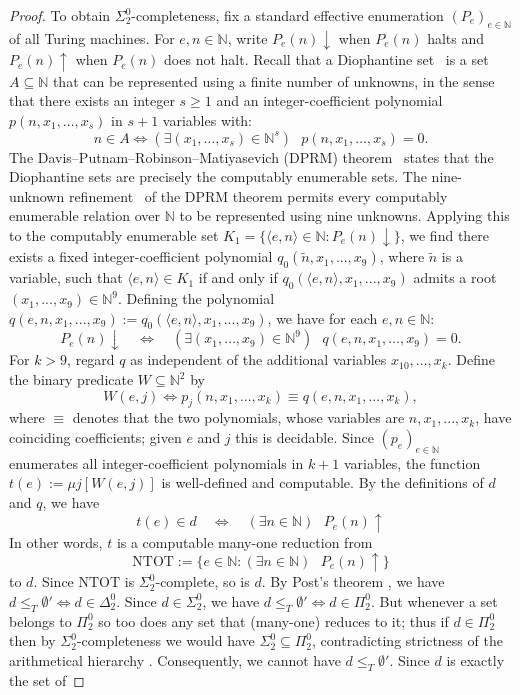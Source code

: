 \documentclass[10pt, a4paper, reqno]{amsart}
\numberwithin{equation}{section}
\renewcommand{\geq}{\geqslant}
\renewcommand{\leq}{\leqslant}
\theoremstyle{definition}
\theoremstyle{definition}
\begin{document}
\begin{proof}
To obtain $\Sigma^{0}_{2}$-completeness, fix a standard effective enumeration $(P_e)_{e\in\mathbb N}$ of all Turing machines. For $e, n \in \mathbb{N}$, write $P_e(n) \downarrow$ when $P_e(n)$ halts and $P_e(n) \uparrow$ when $P_e(n)$ does not halt. Recall that a Diophantine set~\cite{Matiyasevich1993} is a set $A \subseteq \mathbb{N}$ that can be represented using a finite number of unknowns, in the sense that there exists an integer $s \geq 1$ and an integer-coefficient polynomial $p(n, x_1, ..., x_s)$ in $s+1$ variables with:
\begin{equation*}
n \in A \iff (\exists (x_1, \ldots, x_s) \in \mathbb{N}^s) \textrm{ }p(n, x_1, \ldots, x_s) = 0.
\end{equation*}
The Davis--Putnam--Robinson--Matiyasevich (DPRM) theorem~\cite{Matiyasevich1993} states that the Diophantine sets are precisely the computably enumerable sets. The nine-unknown refinement~\cite{Jones1982} of the DPRM theorem permits every computably enumerable relation over $\mathbb N$ to be represented using nine unknowns.
Applying this to the computably enumerable set $K_1 = \{ \langle e, n \rangle \in \mathbb{N} : P_e(n) \downarrow \}$, we find there exists a fixed integer-coefficient polynomial $q_0(\tilde{n}, x_1, ..., x_9)$, where $\tilde{n}$ is a variable, such that $\langle e, n \rangle \in K_1$ if and only if $q_0(\langle e, n \rangle, x_1, ..., x_9)$ admits a root $(x_1, ..., x_9) \in \mathbb{N}^{9}$. Defining the polynomial $q(e, n, x_1, ..., x_9) := q_0(\langle e, n \rangle, x_1, ..., x_9)$, we have for each $e, n \in \mathbb{N}$:
\[
    P_e(n)\downarrow
    \quad\Longleftrightarrow\quad
    (\exists (x_1, \ldots, x_9) \in\mathbb N^9)\textrm{ } q(e,n,x_1,\ldots, x_9)=0.
\]
For $k>9$, regard $q$ as independent of the additional variables
$x_{10},\ldots,x_k$. Define the binary predicate $W \subseteq \mathbb{N}^2$ by
\[
W(e, j) \iff p_j(n, x_1, ..., x_k) \equiv q(e, n, x_1, ..., x_k), 
\]
where $\equiv$ denotes that the two polynomials, whose variables are $n, x_1, ..., x_k$, have coinciding coefficients; given $e$ and $j$ this is decidable. Since $(p_e)_{e \in \mathbb{N}}$ enumerates all integer-coefficient polynomials in $k+1$ variables, the function $t(e) := \mu j[W(e, j)]$ is well-defined and computable. By the definitions of $d$ and $q$, we have
\[
    t(e)\in d
    \quad\Longleftrightarrow\quad
    (\exists n\in\mathbb N)\textrm{ }P_e(n)\uparrow
\]
In other words, $t$ is a computable many-one reduction from
\[
    \mathrm{NTOT}:=\{e\in\mathbb N:(\exists n\in\mathbb N)\textrm{ }P_e(n)\uparrow\}
\]
to $d$. Since $\mathrm{NTOT}$ is $\Sigma^0_2$-complete, so is $d$. By Post's theorem \cite[Chapter~4]{Soare2016}, we have $d \leq_{T} \emptyset' \iff d \in \Delta_{2}^{0}$. Since $d \in \Sigma_{2}^{0}$, we have $d \leq_T \emptyset' \iff d \in \Pi_{2}^{0}$. But whenever a set belongs to $\Pi_{2}^{0}$ so too does any set that (many-one) reduces to it; thus if $d \in \Pi_{2}^{0}$ then by $\Sigma_{2}^{0}$-completeness we would have $\Sigma_{2}^{0} \subseteq \Pi_{2}^{0}$, contradicting strictness of the arithmetical hierarchy \cite[Corollary~4.2.3, p.~85]{Soare2016}. Consequently, we cannot have $d \leq_{T} \emptyset'$. Since $d$ is exactly the set of

\end{proof}
\end{document}
